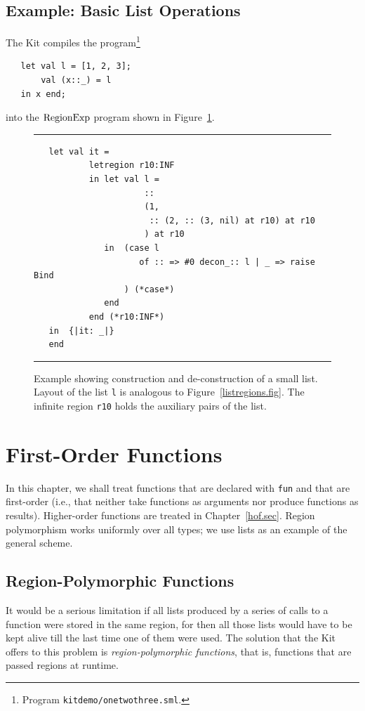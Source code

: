 \documentclass[12pt]{book}
\begin{document}
\section{Example: Basic List Operations}
\label{listexamples.sec}
The Kit compiles the program\footnote{Program \texttt{kitdemo/onetwothree.sml}.}  
\begin{verbatim}
   let val l = [1, 2, 3];
       val (x::_) = l
   in x end;
\end{verbatim}       
into the $\hbox{\rm RegionExp}$ program shown in Figure~\ref{listprint.fig}.
\begin{figure}
\hrule \medskip
\begin{verbatim}
   let val it = 
           letregion r10:INF 
           in let val l = 
                      :: 
                      (1, 
                       :: (2, :: (3, nil) at r10) at r10
                      ) at r10
              in  (case l 
                     of :: => #0 decon_:: l | _ => raise Bind
                  ) (*case*) 
              end  
           end (*r10:INF*)
   in  {|it: _|}
   end 
\end{verbatim}
\caption{Example showing construction and de-construction of a small list.
Layout of the list {\tt l} is analogous to Figure~\ref{listregions.fig}.
The infinite region {\tt r10} holds the auxiliary pairs of the list.
}
\label{listprint.fig}
\medskip

\hrule
\end{figure}


\chapter{First-Order Functions}
In this chapter, we shall treat
%
%
functions that are declared with 
{\tt fun} and that are first-order (i.e., that neither take functions
as arguments nor produce functions as results). Higher-order functions
are treated in Chapter~\ref{hof.sec}.  Region polymorphism works
uniformly over all types; we use lists as an example of the general
scheme.

\section{Region-Polymorphic Functions}
\label{region-polymorphic-functions.sec}
%
It would be a serious limitation if all lists produced by a series of
calls to a function were stored in the same region, for then all those
lists would have to be kept alive till the last time one of them were
used. The solution that the Kit offers to this problem is {\em
  region-polymorphic functions}, that is, functions that are passed
regions at runtime.
\end{document}
